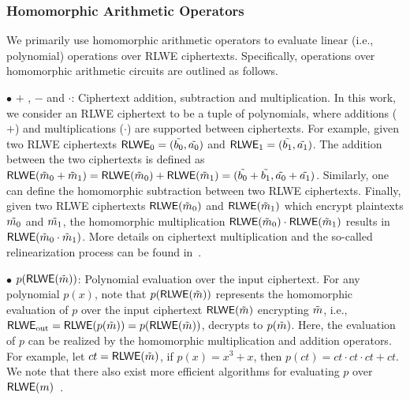 \subsubsection{Homomorphic Arithmetic Operators}
We primarily use homomorphic arithmetic operators to evaluate
linear (i.e., polynomial) operations over RLWE ciphertexts.
Specifically, operations over homomorphic arithmetic circuits
are outlined as follows.

$\bullet$ $+$ , $-$ and $\cdot$: Ciphertext addition, subtraction
and multiplication. In this work, we consider an RLWE ciphertext
to be a tuple of polynomials, where 
additions ($+$) and multiplications ($\cdot$) are supported
between ciphertexts. For example,
given two RLWE ciphertexts ${\mathsf{RLWE}}_0= (\Tilde{b_0}, 
\Tilde{a_0}) $ and ${\mathsf{RLWE}}_1= (\Tilde{b_1}, \Tilde{a_1})$. 
The addition between the two ciphertexts is defined as 
${\mathsf{RLWE}}({\Tilde{m}}_0+{\Tilde{m}}_1)= {\mathsf{RLWE}}({\Tilde{m}}_0)+ {\mathsf{RLWE}}({\Tilde{m}}_1)= 
(\Tilde{b_0} + \Tilde{b_1} , \Tilde{a_0} + \Tilde{a_1})$.
Similarly, one can define the homomorphic subtraction 
between two RLWE ciphertexts. Finally,
given two RLWE ciphertexts ${\mathsf{RLWE}}({\Tilde{m}}_0)$%
and ${\mathsf{RLWE}}({\Tilde{m}}_1)$ %
which encrypt plaintexts $\Tilde{m_0}$ and $\Tilde{m_1}$,
the homomorphic multiplication ${\mathsf{RLWE}}({\Tilde{m}}_0)\cdot {\mathsf{RLWE}}({\Tilde{m}}_1)$ results in 
${\mathsf{RLWE}} ({\Tilde{m}}_0\cdot {\Tilde{m}}_1)$. More details on ciphertext multiplication
and the so-called relinearization process can be found 
in~\cite{DBLP:conf/crypto/brakerski12}.

$\bullet$ $p({\mathsf{RLWE}}({\Tilde{m}}))$: Polynomial evaluation over the input ciphertext. 
For any polynomial $p(x)$, note that $p({\mathsf{RLWE}}({\Tilde{m}}))$ represents
the homomorphic evaluation of $p$ over the input
ciphertext ${\mathsf{RLWE}}({\Tilde{m}})$ encrypting ${\Tilde{m}}$, i.e., ${\mathsf{RLWE}}_{\rm out} = 
{\mathsf{RLWE}}(p({\Tilde{m}}))= p({\mathsf{RLWE}}({\Tilde{m}}))$, 
decrypts to $p({\Tilde{m}})$. Here, the evaluation of $p$ can be realized by the 
homomorphic multiplication and addition operators. For example,
let $ct={\mathsf{RLWE}}({\Tilde{m}})$, if $p(x)=x^3+x$, then $p(ct) = ct\cdot ct\cdot
ct+ct$. We note that there also exist more efficient algorithms
for evaluating $p$ over ${\mathsf{RLWE}}(m)$~\cite{ckksbootsparse, betterboot, 
improvedboot, ckksbootvariance}.

